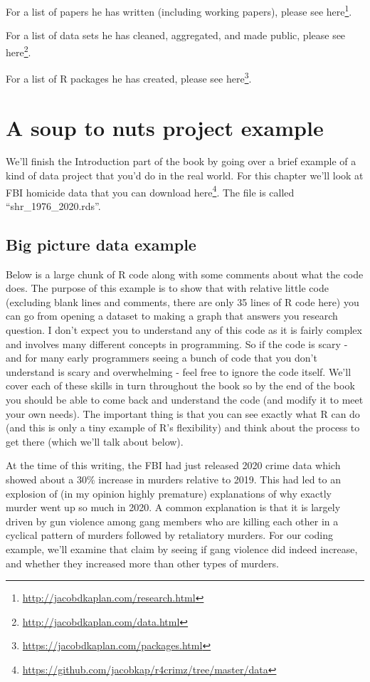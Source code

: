 \documentclass[
]{krantz}
\renewcommand{\href}[2]{#2\footnote{\url{#1}}}
\begin{document}
For a list of papers he has written (including working papers), please see \href{http://jacobdkaplan.com/research.html}{here}.

For a list of data sets he has cleaned, aggregated, and made public, please see \href{http://jacobdkaplan.com/data.html}{here}.

For a list of R packages he has created, please see \href{https://jacobdkaplan.com/packages.html}{here}.

\hypertarget{a-soup-to-nuts-project-example}{%
\chapter{A soup to nuts project example}\label{a-soup-to-nuts-project-example}}

We'll finish the Introduction part of the book by going over a brief example of a kind of data project that you'd do in the real world. For this chapter we'll look at FBI homicide data that you can download \href{https://github.com/jacobkap/r4crimz/tree/master/data}{here}. The file is called ``shr\_1976\_2020.rds''.

\hypertarget{big-picture-data-example}{%
\section{Big picture data example}\label{big-picture-data-example}}

Below is a large chunk of R code along with some comments about what the code does. The purpose of this example is to show that with relative little code (excluding blank lines and comments, there are only 35 lines of R code here) you can go from opening a dataset to making a graph that answers you research question. I don't expect you to understand any of this code as it is fairly complex and involves many different concepts in programming. So if the code is scary - and for many early programmers seeing a bunch of code that you don't understand is scary and overwhelming - feel free to ignore the code itself. We'll cover each of these skills in turn throughout the book so by the end of the book you should be able to come back and understand the code (and modify it to meet your own needs). The important thing is that you can see exactly what R can do (and this is only a tiny example of R's flexibility) and think about the process to get there (which we'll talk about below).

At the time of this writing, the FBI had just released 2020 crime data which showed about a 30\% increase in murders relative to 2019. This had led to an explosion of (in my opinion highly premature) explanations of why exactly murder went up so much in 2020. A common explanation is that it is largely driven by gun violence among gang members who are killing each other in a cyclical pattern of murders followed by retaliatory murders. For our coding example, we'll examine that claim by seeing if gang violence did indeed increase, and whether they increased more than other types of murders.
\end{document}
